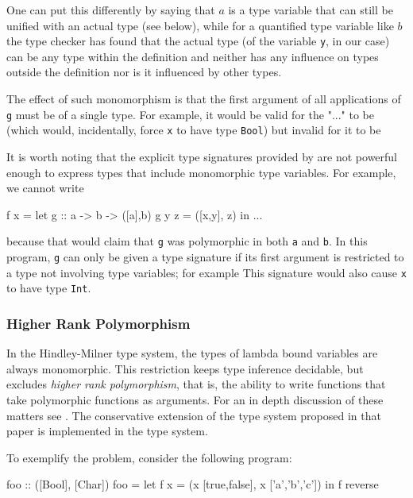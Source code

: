 One can put this differently by saying that $a$ is a type variable that  can still be unified with an actual type (see below), while for a quantified type variable like $b$ the type checker has found that the actual type (of the variable \texttt{y}, in our case) can be any type within the definition and neither has any influence on types outside the definition nor is it influenced by other types.

The effect of such monomorphism is that the first argument of all applications of \texttt{g} must be of a single type. For example, it would be valid for the "..." to be 
(which would, incidentally, force \texttt{x} to have type \texttt{Bool}) but invalid for it to be 

It is worth noting that the explicit type signatures provided by \frege{} are not powerful enough to express types that include monomorphic type variables.
For example, we cannot write
\begin{code}
    f x = let
            g :: a -> b -> ([a],b)
            g y z = ([x,y], z)
        in ...
\end{code}
because that would claim that \texttt{g} was polymorphic in both \texttt{a} and \texttt{b}. In this program, \texttt{g} can only be given a type signature if its first argument is restricted to a type not involving type variables; for example 
This signature would also cause \texttt{x} to have type \texttt{Int}.

\subsubsection{Higher Rank Polymorphism} \label{higher-rank}

In the Hindley-Milner type system, the types of lambda bound variables are always monomorphic. This restriction keeps type inference decidable, but excludes \emph{higher rank polymorphism}, that is, the ability to write functions that take polymorphic functions as arguments. For an in depth discussion of these matters see \cite{ptifart}. The conservative extension of the type system proposed in that paper is  implemented in the \frege{} type system.

To exemplify the problem, consider the following program:

\begin{code}
foo :: ([Bool], [Char])
foo = let
        f x = (x [true,false], x ['a','b','c'])
    in f reverse
\end{code}

